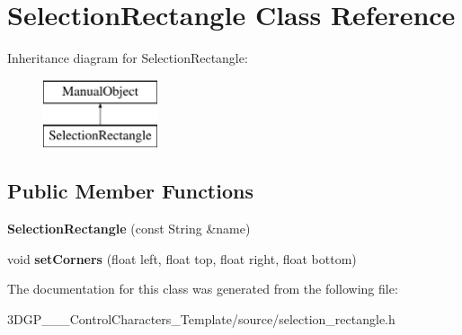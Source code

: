 \hypertarget{class_selection_rectangle}{}\section{Selection\+Rectangle Class Reference}
\label{class_selection_rectangle}
Inheritance diagram for Selection\+Rectangle\+:\begin{figure}[H]
\begin{center}
\leavevmode
\includegraphics[height=2.000000cm]{class_selection_rectangle}
\end{center}
\end{figure}
\subsection*{Public Member Functions}
\begin{DoxyCompactItemize}
\item 
\mbox{\label{class_selection_rectangle_a0f65ff3b042ba0163ab66fad82540420}} 
{\bfseries Selection\+Rectangle} (const String \&name)
\item 
\mbox{\label{class_selection_rectangle_a89a4528287559860ed9f2a3e6152f275}} 
void {\bfseries set\+Corners} (float left, float top, float right, float bottom)
\end{DoxyCompactItemize}


The documentation for this class was generated from the following file\+:\begin{DoxyCompactItemize}
\item 
3\+D\+G\+P\+\_\+\_\+\_\+\+Control\+Characters\+\_\+\+Template/source/selection\+\_\+rectangle.\+h\end{DoxyCompactItemize}
